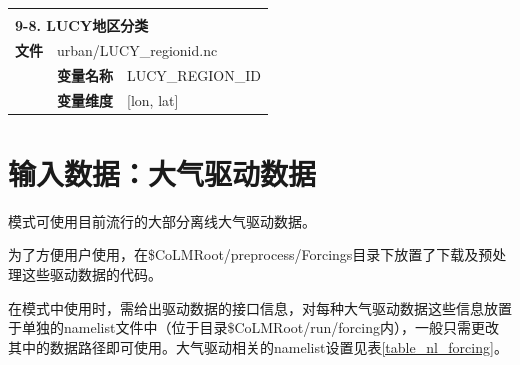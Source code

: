 \documentclass[a4paper,12pt,twoside]{article}
\begin{document}
{\begin{longtable}{llp{}}
\midrule
\vspace{2\baselineskip}\\
\multicolumn{3}{l}{\textbf{9-8. LUCY地区分类}} \\
\cline{1-3}
\textbf{文件} & \multicolumn{2}{l}{urban/LUCY\_regionid.nc} \\
\cline{2-3}
& \textbf{变量名称} & LUCY\_REGION\_ID \\
& \textbf{变量维度} & {[}lon, lat{]} \\

\end{longtable}}

\section{输入数据：大气驱动数据}

模式可使用目前流行的大部分离线大气驱动数据。\par
为了方便用户使用，在\$CoLMRoot/preprocess/Forcings目录下放置了下载及预处理这些驱动数据的代码。\par
在模式中使用时，需给出驱动数据的接口信息，对每种大气驱动数据这些信息放置于单独的namelist文件中（位于目录\$CoLMRoot/run/forcing内），一般只需更改其中的数据路径即可使用。大气驱动相关的namelist设置见表\ref{table_nl_forcing}。
\end{document}
